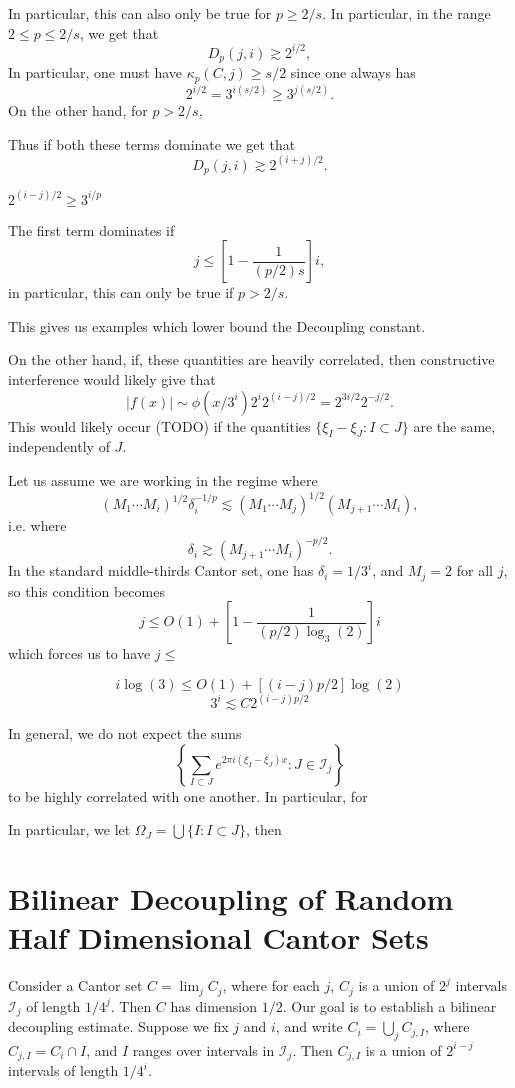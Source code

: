 \documentclass[dvipsnames,letterpaper,12pt]{article}
\numberwithin{equation}{section}
\numberwithin{theorem}{section}
\begin{document}
In particular, this can also only be true for $p \geq 2/s$. In particular, in the range $2 \leq p \leq 2/s$, we get that
%
\[ D_p(j,i) \gtrsim 2^{i/2}, \]
%
In particular, one must have $\kappa_p(C,j) \geq s/2$ since one always has
%
\[ 2^{i/2} = 3^{i (s/2)} \geq 3^{j(s/2)}. \]
%
On the other hand, for $p > 2/s$, 



Thus if both these terms dominate we get that
%
\[ D_p(j,i) \gtrsim 2^{(i+j)/2}. \]

$2^{(i-j)/2} \geq 3^{i/p}$


The first term dominates if
%
\[ j \leq \left[ 1 - \frac{1}{(p/2) s} \right] i, \]
%
in particular, this can only be true if $p > 2/s$.

This gives us examples which lower bound the Decoupling constant.

On the other hand, if, these quantities are heavily correlated, then constructive interference would likely give that
%
\[ |f(x)| \sim \phi(x / 3^i) 2^i 2^{(i-j)/2} = 2^{3i/2} 2^{-j/2}. \]
%
This would likely occur (TODO) if the quantities $\{ \xi_I - \xi_J : I \subset J \}$ are the same, independently of $J$.

Let us assume we are working in the regime where
%
\[ (M_1 \cdots M_i)^{1/2} \delta_i^{-1/p} \lesssim (M_1 \cdots M_j)^{1/2} (M_{j+1} \cdots M_i), \]
%
i.e. where
%
\[ \delta_i \gtrsim (M_{j+1} \cdots M_i)^{-p/2}. \]
%
In the standard middle-thirds Cantor set, one has $\delta_i = 1/3^i$, and $M_j = 2$ for all $j$, so this condition becomes
%
\[ j \leq O(1) + \left[ 1 - \frac{1}{(p/2) \log_3(2)} \right] i \]
%
which forces us to have $j \leq $

\[ i \log(3) \leq O(1) + [(i-j) p / 2] \log(2) \]
\[ 3^i \lesssim C 2^{(i-j)p/2} \]

In general, we do not expect the sums
%
\[ \left\{ \sum_{I \subset J} e^{2 \pi i (\xi_I - \xi_J) x} : J \in \mathcal{I}_j \right\} \]
%
to be highly correlated with one another. In particular, for 

In particular, we let $\Omega_J = \bigcup \{ I : I \subset J \}$, then



\section{Bilinear Decoupling of Random Half Dimensional Cantor Sets}

Consider a Cantor set $C = \lim_j C_j$, where for each $j$, $C_j$ is a union of $2^j$ intervals $\mathcal{I}_j$ of length $1/4^j$. Then $C$ has dimension $1/2$. Our goal is to establish a bilinear decoupling estimate. Suppose we fix $j$ and $i$, and write $C_i = \bigcup_j C_{j,I}$, where $C_{j,I} = C_i \cap I$, and $I$ ranges over intervals in $\mathcal{I}_j$. Then $C_{j,I}$ is a union of $2^{i-j}$ intervals of length $1/4^i$.
\end{document}
